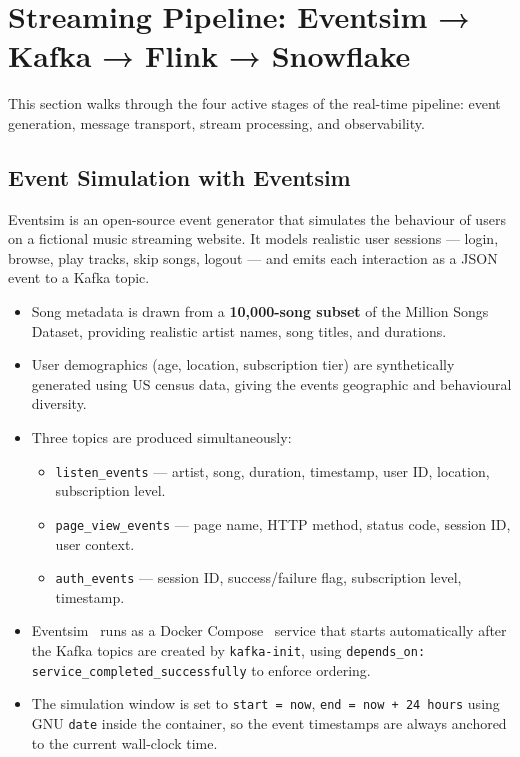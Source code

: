 \section{Streaming Pipeline: Eventsim → Kafka → Flink → Snowflake}

This section walks through the four active stages of the real-time pipeline:
event generation, message transport, stream processing, and observability.

\subsection{Event Simulation with Eventsim}

Eventsim is an open-source event generator that simulates the behaviour of users on a
fictional music streaming website.
It models realistic user sessions — login, browse, play tracks, skip songs, logout —
and emits each interaction as a JSON event to a Kafka topic.

\begin{itemize}
  \item Song metadata is drawn from a \textbf{10,000-song subset} of the Million Songs Dataset,
        providing realistic artist names, song titles, and durations.
  \item User demographics (age, location, subscription tier) are synthetically generated
        using US census data, giving the events geographic and behavioural diversity.
  \item Three topics are produced simultaneously:
    \begin{itemize}
      \item \texttt{listen\_events} — artist, song, duration, timestamp, user ID, location, subscription level.
      \item \texttt{page\_view\_events} — page name, HTTP method, status code, session ID, user context.
      \item \texttt{auth\_events} — session ID, success/failure flag, subscription level, timestamp.
    \end{itemize}
  \item Eventsim~\cite{eventsim} runs as a Docker Compose~\cite{docker_compose} service that starts automatically after the Kafka topics
        are created by \texttt{kafka-init}, using \texttt{depends\_on: service\_completed\_successfully}
        to enforce ordering.
  \item The simulation window is set to \texttt{start = now}, \texttt{end = now + 24 hours} using
        GNU \texttt{date} inside the container, so the event timestamps are always anchored to
        the current wall-clock time.
\end{itemize}

